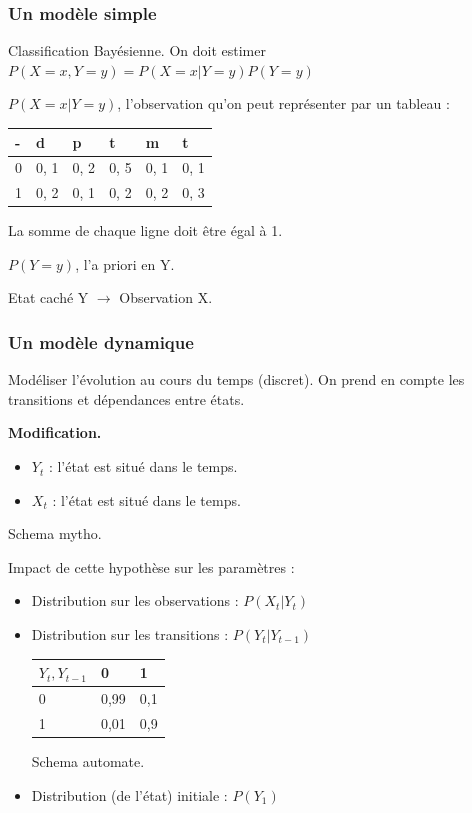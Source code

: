 \documentclass{article}
\begin{document}
\subsubsection{Un modèle simple} 

Classification Bayésienne. On doit estimer $P(X = x, Y = y) = P(X = x | Y = y) P(Y = y)$

$P(X = x | Y = y)$, l'observation qu'on peut représenter par un tableau : 
\begin{tabular}{|l|l|l|l|l|l|}
  \hline
  - & d & p & t & m & t \\
  \hline
  0 & 0, 1 & 0, 2 & 0, 5 & 0, 1 & 0, 1 \\
  1 & 0, 2 & 0, 1 & 0, 2 & 0, 2 & 0, 3 \\
  \hline
\end{tabular}

La somme de chaque ligne doit être égal à 1. 

$P(Y = y)$, l'a priori en Y.

Etat caché Y $\rightarrow$ Observation X.

\subsubsection{Un modèle dynamique} 

Modéliser l'évolution au cours du temps (discret). On prend en compte les transitions et dépendances entre états.

\textbf{Modification.} 
\begin{itemize}
\item $Y_t$ : l'état est situé dans le temps.
\item $X_t$ : l'état est situé dans le temps.
\end{itemize}

Schema mytho.

Impact de cette hypothèse sur les paramètres : 
\begin{itemize}
\item Distribution sur les observations : $P(X_t | Y_t)$
\item Distribution sur les transitions : $P(Y_t | Y_{t - 1})$
      \begin{tabular}{|l|l|l|}
        \hline
        $Y_t, Y_{t-1}$ & 0 & 1 \\
        \hline
        0 & 0,99 & 0,1 \\
        1 & 0,01 & 0,9 \\
        \hline
      \end{tabular}

Schema automate.

\item Distribution (de l'état) initiale : $P(Y_1)$
\end{itemize}
\end{document}
